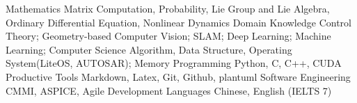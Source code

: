 

\begin{cvskills}
  \cvskill
    {Mathematics} %
    {Matrix Computation, Probability, Lie Group and Lie Algebra, Ordinary Differential Equation, Nonlinear Dynamics} %
  \cvskill
    {Domain Knowledge} %
    {Control Theory; Geometry-based Computer Vision; SLAM; Deep Learning; Machine Learning;  } %
  \cvskill
    {Computer Science} %
    {Algorithm, Data Structure, Operating System(LiteOS, AUTOSAR); Memory} %
  \cvskill
    {Programming} %
    {Python, C, C++, CUDA} %
  \cvskill
    {Productive Tools} %
    {Markdown, Latex, Git, Github, plantuml} %
  \cvskill
    {Software Engineering} %
    {CMMI, ASPICE, Agile Development} %
  \cvskill
    {Languages} %
    {Chinese, English (IELTS 7)} %
\end{cvskills}
